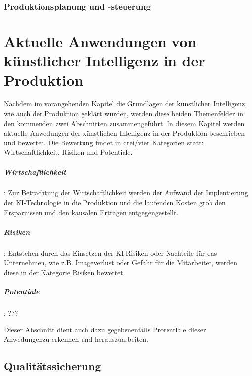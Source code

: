 \documentclass[a4paper,12pt, german]{report}
\begin{document}
\subsection{Produktionsplanung und -steuerung}


\chapter{Aktuelle Anwendungen von künstlicher Intelligenz in der Produktion}

Nachdem im vorangehenden Kapitel die Grundlagen der künstlichen Intelligenz, wie auch der Produktion geklärt wurden, werden diese beiden Themenfelder in den kommenden zwei Abschnitten zusammengeführt. In diesem Kapitel werden aktuelle Anwedungen der künstlichen Intelligenz in der Produktion beschrieben und bewertet. Die Bewertung findet in drei/vier Kategorien statt: Wirtschaftlichkeit, Risiken und Potentiale.

\paragraph{Wirtschaftlichkeit}:  Zur Betrachtung der Wirtschaftlichkeit werden der Aufwand der Implentierung der KI-Technologie in die Produktion und die laufenden Kosten grob den Ersparnissen und den kausalen Erträgen entgegengestellt. 
\paragraph{Risiken}: Entstehen durch das Einsetzen der KI Risiken oder Nachteile für das Unternehmen, wie z.B. Imageverlust oder Gefahr für die Mitarbeiter, werden diese in der Kategorie Risiken bewertet.
\paragraph{Potentiale}: ??? 

Dieser Abschnitt dient auch dazu gegebenenfalls Protentiale dieser Anwedungenzu erkennen und herauszuarbeiten.






\section{Qualitätssicherung}
\end{document}
